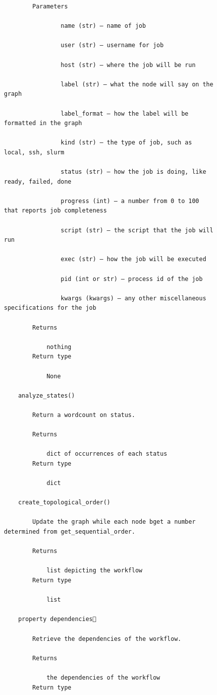 \begin{figure}[htb]
\begin{verbatim}
        Parameters

                name (str) – name of job

                user (str) – username for job

                host (str) – where the job will be run

                label (str) – what the node will say on the graph

                label_format – how the label will be formatted in the graph

                kind (str) – the type of job, such as local, ssh, slurm

                status (str) – how the job is doing, like ready, failed, done

                progress (int) – a number from 0 to 100 that reports job completeness

                script (str) – the script that the job will run

                exec (str) – how the job will be executed

                pid (int or str) – process id of the job

                kwargs (kwargs) – any other miscellaneous specifications for the job

        Returns

            nothing
        Return type

            None

    analyze_states()

        Return a wordcount on status.

        Returns

            dict of occurrences of each status
        Return type

            dict

    create_topological_order()

        Update the graph while each node bget a number determined from get_sequential_order.

        Returns

            list depicting the workflow
        Return type

            list

    property dependencies

        Retrieve the dependencies of the workflow.

        Returns

            the dependencies of the workflow
        Return type


\end{verbatim}
\end{figure}
